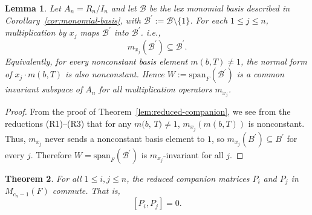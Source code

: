 \documentclass[11pt]{amsart}
\theoremstyle{plain}
\newtheorem{theorem}{Theorem}[section]
\newtheorem{lemma}[theorem]{Lemma}
\theoremstyle{definition}
\theoremstyle{remark}
\begin{document}
\begin{lemma}\label{lem:nonconstant-invariant}
	Let $A_n=R_n/I_n$ and let $\mathcal{B}$ be the lex monomial basis described in Corollary~\ref{cor:monomial-basis}, with $\mathcal{B}^\prime:= \mathcal{B}\setminus\{1\}$. For each $1\le j\le n$, multiplication by $x_j$ maps $\mathcal{B}^\prime$ into $\mathcal{B}^\prime$. i.e.,
	\[
	m_{x_j}(\mathcal{B}^\prime)\subseteq \mathcal{B}^\prime.
	\]
	Equivalently, for every nonconstant basis element $m(b,T)\neq 1$,
	the normal form of $x_j\cdot m(b,T)$ is also nonconstant.
	Hence $W:=\mathrm{span}_F(\mathcal{B}^\prime)$ is a common invariant subspace of $A_n$
	for all multiplication operators $m_{x_j}$.
\end{lemma}

\begin{proof}
	From the proof of Theorem~\ref{lem:reduced-companion}, we see from the reductions (R1)--(R3) that for any $m\!\bigl(b,\,T) \neq 1$, $m_{x_j}( m(b,T))$ is nonconstant. Thus, $m_{x_j}$ never sends a nonconstant basis element to $1$, so $m_{x_j}(B^\prime)\subseteq B^\prime$
	for every $j$. Therefore $W=\mathrm{span}_F(\mathcal{B}^\prime)$ is $m_{x_j}$-invariant for all $j$.
\end{proof}

\begin{theorem}
	\label{thm:commuting-reduced}
	 For all $1\le i,j\le n$, the reduced companion matrices $P_i$ and $P_j$ in \( M_{c_n-1}(F) \) commute. That is,
	\[
	[P_i,P_j]=0 .
	\]
\end{theorem}
\end{document}
